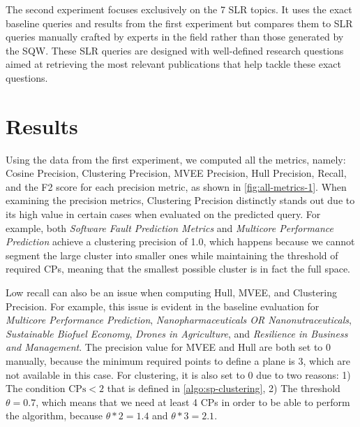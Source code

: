 The second experiment focuses exclusively on the 7 SLR topics. It uses the exact baseline queries and results from the first experiment but compares them to SLR queries manually crafted by experts in the field rather than those generated by the SQW. These SLR queries are designed with well-defined research questions aimed at retrieving the most relevant publications that help tackle these exact questions.

\section{Results}
Using the data from the first experiment, we computed all the metrics, namely: Cosine Precision, Clustering Precision, MVEE Precision, Hull Precision, Recall, and the F2 score for each precision metric, as shown in \autoref{fig:all-metrics-1}. When examining the precision metrics, Clustering Precision distinctly stands out due to its high value in certain cases when evaluated on the predicted query. For example, both \textit{Software Fault Prediction Metrics} and \textit{Multicore Performance Prediction} achieve a clustering precision of 1.0, which happens because we cannot segment the large cluster into smaller ones while maintaining the threshold of required CPs, meaning that the smallest possible cluster is in fact the full space.

Low recall can also be an issue when computing Hull, MVEE, and Clustering Precision. For example, this issue is evident in the baseline evaluation for \textit{Multicore Performance Prediction}, \textit{Nanopharmaceuticals OR Nanonutraceuticals}, \textit{Sustainable Biofuel Economy}, \textit{Drones in Agriculture}, and \textit{Resilience in Business and Management}. The precision value for MVEE and Hull are both set to 0 manually, because the minimum required points to define a plane is 3, which are not available in this case. For clustering, it is also set to 0 due to two reasons: 1) The condition $\text{CPs} < 2$ that is defined in \autoref{algo:sp-clustering},
2) The threshold $\theta = 0.7$, which means that we need at least 4 CPs in order to be able to perform the algorithm, because $ \theta * 2 = 1.4 $ and $ \theta * 3 = 2.1 $.

